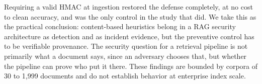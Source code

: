 Requiring a valid HMAC at ingestion restored the defense completely, at no cost to
clean accuracy, and was the only control in the study that did. We take this as the practical
conclusion: content-based heuristics belong in a RAG security architecture as detection and as
incident evidence, but the preventive control has to be verifiable provenance. The security
question for a retrieval pipeline is not primarily what a document says, since an adversary
chooses that, but whether the pipeline can prove who put it there. These findings are bounded by
corpora of 30 to 1,999 documents and do not establish behavior at enterprise index scale.
